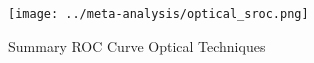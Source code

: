\begin{figure}[p]
\centering

\texttt{[image: ../meta-analysis/optical\_sroc.png]}

\caption[Summary ROC Curve Optical Techniques]{Summary ROC Curve Optical Techniques}
\label{fig:optical_sroc}
\end{figure}
